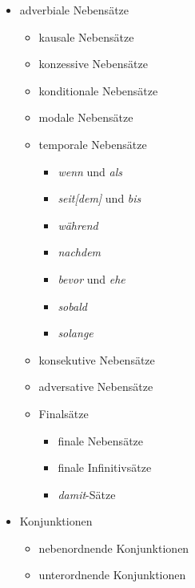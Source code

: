 \documentclass[a4paper]{article}
\begin{document}
\begin{itemize}
\begin{itemize}
                \item adverbiale Nebensätze
                \begin{itemize}
                    \item kausale Nebensätze
                    \item konzessive Nebensätze
                    \item konditionale Nebensätze
                    \item modale Nebensätze
                    \item temporale Nebensätze
                    \begin{itemize}
                        \item \textit{wenn} und \textit{als}
                        \item \textit{seit[dem]} und \textit{bis}
                        \item \textit{während}
                        \item \textit{nachdem}
                        \item \textit{bevor} und \textit{ehe}
                        \item \textit{sobald}
                        \item \textit{solange}
                    \end{itemize}
                    \item konsekutive Nebensätze
                    \item adversative Nebensätze
                    \item Finalsätze
                    \begin{itemize}
                        \item finale Nebensätze
                        \item finale Infinitivsätze
                        \item \textit{damit}-Sätze
                    \end{itemize}
                \end{itemize}
                
                \item Konjunktionen
                \begin{itemize}
                    \item nebenordnende Konjunktionen
                    \item unterordnende Konjunktionen
                \end{itemize}
            \end{itemize}
            

\end{itemize}
\end{document}
